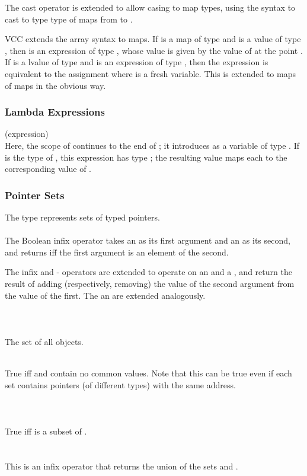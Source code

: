 \documentclass[preprint,nocopyrightspace]{sigplanconf}
\begin{document}
{The cast operator is extended to allow casing to map types, 
using the syntax  to cast  to type type of maps
from  to .

VCC extends the array syntax to maps. If  is a map of
type  and  is a value of type ,
then  is an expression of type , whose value is
given by the value of  at the point . If  is a
lvalue of type  and  is an expression of
type , then the expression  is equivalent to
the assignment 
where  is a fresh variable. This is extended to maps of maps in
the obvious way.

\subsubsection{Lambda Expressions}
 (expression)\\
Here, the scope of  continues to the end of ; it
introduces  as a variable of type . If  is the
type of , this expression has type ; the resulting
value maps each  to the corresponding value of .

\subsubsection{Pointer Sets}
The type \vcc{\objset} represents sets of typed pointers.
\\\\
The Boolean infix operator \vcc{\in} takes an
\vcc{\object} as its first argument and an \vcc{\objset} as its second,
and returns \vcc{\true} iff the first argument is an
element of the second.

The infix \vcc{+} and {-} operators are extended to operate on
an \vcc{\objset} and a \vcc{\object}, and return the result of adding
(respectively, removing) the value of the second argument from the
value of the first. The \vcc{+=} an \vcc{-=} are extended analogously.
\\\\
\vcc{\objset \everything()}\\
\vcc{\objset \universe()}\\
The set of all objects.

\\
True iff  and  contain no common values. Note that
this can be true even if each set contains pointers (of different
types) with the same address.\\
\\\\
\\
True iff  is a subset of .
\\\\
\\
This is an infix operator that returns the union of the sets 
and .

}
\end{document}
